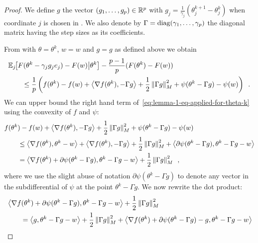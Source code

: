 \begin{proof}
  We define $g$ the vector $(g_1, \dots, g_p) \in \mathbb R^p$ with
  $g_j = \frac{1}{\gamma_j} (\theta^{k+1}_j - \theta^k_j)$ when coordinate $j$
  is chosen in .
  We also denote by $\Gamma = \operatorname{diag}(\gamma_1, \dots, \gamma_p)$ the diagonal
  matrix having the step sizes as its coefficients.

  From  with $\theta = \theta^k$, $w = w$ and
  $g = g$ as defined above we obtain
  \begin{align}
    \label{eq:lemma-1-eq-applied-for-theta-k}
     & \mathbb E_{j} \hspace{-0.29em} \left[ F(\theta^k - \gamma_j g_j e_j) - F(w) \middle\vert \theta^k \right] - \frac{p - 1}{p} (F(\theta^k) - F(w)) \nonumber \\
     & \qquad \le \frac{1}{p} \left(f(\theta^k) - f(w) + \left\langle \nabla f(\theta^k), - \Gamma g \right\rangle
    + \frac{1}{2}\left \lVert \Gamma g \right \rVert_{M}^2 + \psi(\theta^k - \Gamma g) - \psi
    (w)\right)\enspace.
  \end{align}
  We can upper bound the right hand term of~\eqref{eq:lemma-1-eq-applied-for-theta-k}
  using the convexity of $f$ and $\psi$:
  \begin{align}
     & f(\theta^k) - f(w) + \left\langle \nabla f(\theta^k), - \Gamma g \right\rangle
    + \frac{1}{2}\left \lVert \Gamma g \right \rVert_{M}^2
    + \psi(\theta^k - \Gamma g) - \psi(w)                                                                \\
     & \qquad \le \left\langle \nabla f(\theta^k), \theta^k - w \right\rangle + \left\langle \nabla f(\theta^k), - \Gamma g \right\rangle
    + \frac{1}{2}\left \lVert \Gamma g \right \rVert_{M}^2
    + \left\langle \partial \psi(\theta^k - \Gamma g), \theta^k - \Gamma g - w \right\rangle                               \\
     & \qquad = \left\langle \nabla f(\theta^k) + \partial \psi(\theta^k - \Gamma g), \theta^k- \Gamma g - w \right\rangle
    + \frac{1}{2}\left \lVert \Gamma g \right \rVert_{M}^2\enspace,
  \end{align}
  where we use the slight abuse of notation $\partial \psi(\theta^k - \Gamma g)$ to
  denote any vector in the subdifferential of $\psi$ at the point $\theta^k -
    \Gamma g$. %
  We now rewrite the dot product:
  \begin{align}
     & \scalar{\nabla f(\theta^k) + \partial \psi(\theta^k - \Gamma g)}{\theta^k- \Gamma g - w}
    + \frac{1}{2}\norm{\Gamma g}_{M}^2                                                             \\
     & \qquad = \scalar{g}{\theta^k- \Gamma g - w}
    + \frac{1}{2}\norm{\Gamma g}_{M}^2
    + \scalar{\nabla f(\theta^k) + \partial \psi(\theta^k - \Gamma g) - g}{\theta^k- \Gamma g - w} \\

\end{align}
\end{proof}

